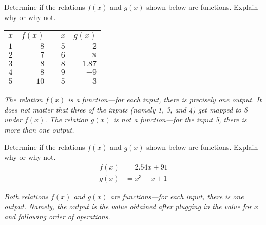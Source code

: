 \documentclass[11pt,letterpaper]{article}
\begin{document}
\newpage





 Determine if the relations $f(x)$ and $g(x)$ shown below are functions. Explain why or why not. 
	\begin{table}[!ht]
	\centering
	\begin{tabular}{c|rcc|r}
	$x$ & $f(x)$ & \hspace{1cm} & $x$ & $g(x)$ \\ \cline{1-2} \cline{4-5}
	$1$ & $8$ & & $5$ & $2$ \\
	$2$ & $-7$ & & $6$ & $\pi$ \\
	$3$ & $8$ & & $8$ & $1.87$ \\
	$4$ & $8$ & & $9$ & $-9$ \\
	$5$ & $10$ & & $5$ & $3$
	\end{tabular}
	\end{table} \pspace

{\itshape The relation $f(x)$ is a function---for each input, there is precisely one output. It does not matter that three of the inputs (namely 1, 3, and 4) get mapped to 8 under $f(x)$. The relation $g(x)$ is not a function---for the input 5, there is more than one output.}





\newpage





 Determine if the relations $f(x)$ and $g(x)$ shown below are functions. Explain why or why not. 
	\[
	\begin{aligned}
	f(x)&= 2.54x + 91 \\[0.3cm]
	g(x)&= x^3 - x + 1
	\end{aligned}
	\] \pspace

{\itshape Both relations $f(x)$ and $g(x)$ are functions---for each input, there is one output. Namely, the output is the value obtained after plugging in the value for $x$ and following order of operations.}





\newpage
\end{document}
